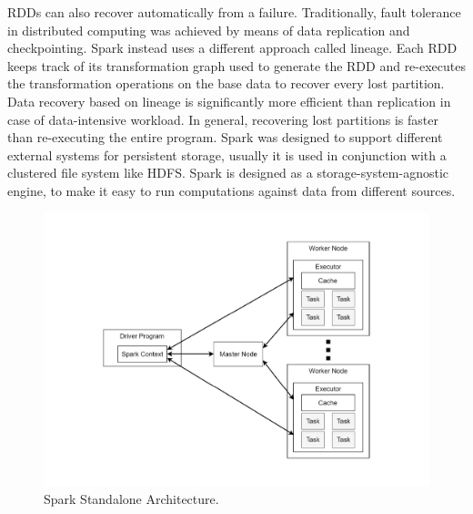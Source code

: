 RDDs can also recover automatically from a failure. Traditionally, fault tolerance in distributed computing was achieved by means of data replication and checkpointing. Spark instead uses a different approach called lineage. Each RDD keeps track of its transformation graph used to generate the RDD and re-executes the transformation operations on the base data to recover every lost partition. Data recovery based on lineage is significantly more efficient than replication in case of data-intensive workload. In general, recovering lost partitions is faster than re-executing the entire program. Spark was designed to support different external systems for persistent storage, usually it is used in conjunction with a clustered file system like HDFS. Spark is designed as a storage-system-agnostic engine, to make it easy to run computations against data from different sources.
\begin{figure}
	\centering
	\includegraphics[width=\columnwidth]{Images/spark_standalone_architecture.pdf}  
	\caption[Spark Standalone Architecture]{Spark Standalone Architecture.}
	\label{fig:sparkStandaloneArchitecture}
\end{figure}

